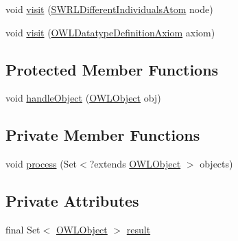 \begin{DoxyCompactItemize}
\item 
void \hyperlink{classorg_1_1semanticweb_1_1owlapi_1_1util_1_1_o_w_l_object_component_collector_a9b685b71bcf38a72bdd39dbb9b5a3687}{visit} (\hyperlink{interfaceorg_1_1semanticweb_1_1owlapi_1_1model_1_1_s_w_r_l_different_individuals_atom}{S\-W\-R\-L\-Different\-Individuals\-Atom} node)
\item 
void \hyperlink{classorg_1_1semanticweb_1_1owlapi_1_1util_1_1_o_w_l_object_component_collector_ae45a4f207710202879ad4604d39b57fe}{visit} (\hyperlink{interfaceorg_1_1semanticweb_1_1owlapi_1_1model_1_1_o_w_l_datatype_definition_axiom}{O\-W\-L\-Datatype\-Definition\-Axiom} axiom)
\end{DoxyCompactItemize}
\subsection*{Protected Member Functions}
\begin{DoxyCompactItemize}
\item 
void \hyperlink{classorg_1_1semanticweb_1_1owlapi_1_1util_1_1_o_w_l_object_component_collector_a09dcc19ee87d465b96d755e9aac05add}{handle\-Object} (\hyperlink{interfaceorg_1_1semanticweb_1_1owlapi_1_1model_1_1_o_w_l_object}{O\-W\-L\-Object} obj)
\end{DoxyCompactItemize}
\subsection*{Private Member Functions}
\begin{DoxyCompactItemize}
\item 
void \hyperlink{classorg_1_1semanticweb_1_1owlapi_1_1util_1_1_o_w_l_object_component_collector_a6aef4724e6c3bc8dde3878a066f04691}{process} (Set$<$?extends \hyperlink{interfaceorg_1_1semanticweb_1_1owlapi_1_1model_1_1_o_w_l_object}{O\-W\-L\-Object} $>$ objects)
\end{DoxyCompactItemize}
\subsection*{Private Attributes}
\begin{DoxyCompactItemize}
\item 
final Set$<$ \hyperlink{interfaceorg_1_1semanticweb_1_1owlapi_1_1model_1_1_o_w_l_object}{O\-W\-L\-Object} $>$ \hyperlink{classorg_1_1semanticweb_1_1owlapi_1_1util_1_1_o_w_l_object_component_collector_abb78d77da90af1d188bcbff3aa3af349}{result}
\end{DoxyCompactItemize}


